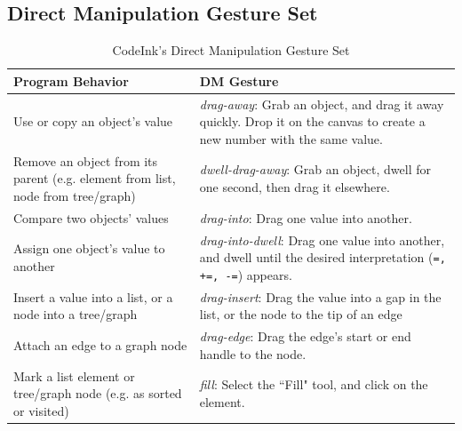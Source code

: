 \subsection{Direct Manipulation Gesture Set}

\begin{table}[!b]
\renewcommand{\arraystretch}{1.75}
\caption{CodeInk's Direct Manipulation Gesture Set}
\label{tbl:gesture_table}
\centering
\begin{tabular}{|p{3.8cm} |p{3.8cm} |}
\hline
\textbf{Program Behavior} & \textbf{DM Gesture} \\
\hline
Use or copy an object's value & {\em drag-away}: Grab an object, and drag it
away quickly.
Drop it on the canvas to create a new number with the same value.
\\
\hline
Remove an object from its parent (e.g. element from list, node from tree/graph) & {\em dwell-drag-away}: Grab an object, dwell for one second, then
drag it elsewhere.
\\
\hline
Compare two objects' values & {\em drag-into}: Drag one value into another.
\\
\hline
Assign one object's value to another &
{\em drag-into-dwell}: Drag one value into another, and
dwell until the desired interpretation (\texttt{=, +=, -=}) appears. \\
\hline
Insert a value into a list, or a node into a tree/graph
& {\em drag-insert}: Drag the value into a gap in the list, or the node to the
tip of an edge
\\

\hline
Attach an edge to a graph node
& {\em drag-edge}: Drag the edge's start or end handle to the node.
\\

\hline
Mark a list element or tree/graph node (e.g. as sorted or visited) &
{\em fill}: Select the ``Fill" tool, and click on the element. \\
\hline
\end{tabular}
\end{table}

